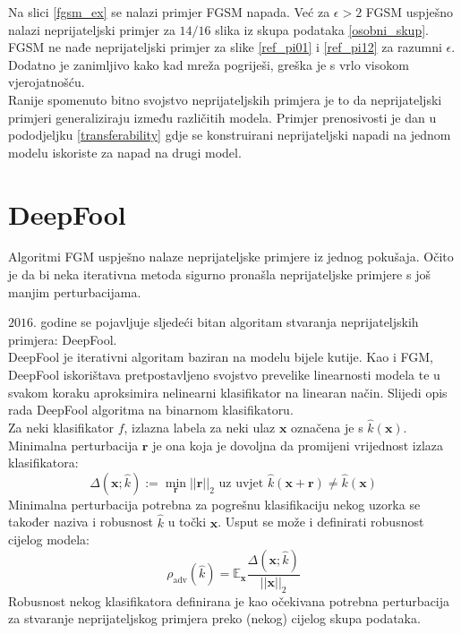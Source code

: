 \documentclass[utf8, diplomski]{fer}
\begin{document}
Na slici \ref{fgsm_ex} se nalazi primjer FGSM napada. Već za $\epsilon > 2$ FGSM uspješno nalazi neprijateljski primjer za $14/16$ slika iz skupa podataka \ref{osobni_skup}. FGSM ne nađe neprijateljski primjer za slike \ref{ref_pi01} i \ref{ref_pi12} za razumni $\epsilon$. Dodatno je zanimljivo kako kad mreža pogriješi, greška je s vrlo visokom vjerojatnošću. \\
Ranije spomenuto bitno svojstvo neprijateljskih primjera je to da neprijateljski primjeri generaliziraju između različitih modela. Primjer prenosivosti je dan u pododjeljku \ref{transferability} gdje se konstruirani neprijateljski napadi na jednom modelu iskoriste za napad na drugi model.
\section{DeepFool}
Algoritmi FGM uspješno nalaze neprijateljske primjere iz jednog pokušaja. Očito je da bi neka iterativna metoda sigurno pronašla neprijateljske primjere s još manjim perturbacijama.
\par
$2016.$ godine se pojavljuje sljedeći bitan algoritam stvaranja neprijateljskih primjera: DeepFool.\\
DeepFool je iterativni algoritam baziran na modelu bijele kutije. Kao i FGM, DeepFool iskorištava pretpostavljeno svojstvo prevelike linearnosti modela te u svakom koraku aproksimira nelinearni klasifikator na linearan način. Slijedi opis rada DeepFool algoritma na binarnom klasifikatoru. \\
Za neki klasifikator $f$, izlazna labela za neki ulaz $\boldsymbol{x}$ označena je s $\hat{k}(\boldsymbol{x})$. Minimalna perturbacija $\boldsymbol{r}$ je ona koja je dovoljna da promijeni vrijednost izlaza klasifikatora:
\begin{equation}
	\Delta (\boldsymbol{x}; \hat{k}) := \mathop{\min}_{\boldsymbol{r}} ||\boldsymbol{r}||_{2} \text{ uz uvjet } \hat{k}(\boldsymbol{x}+\boldsymbol{r}) \neq \hat{k}(\boldsymbol{x})
\end{equation}
Minimalna perturbacija potrebna za pogrešnu klasifikaciju nekog uzorka se također naziva i robusnost $\hat{k}$ u točki $\boldsymbol{x}$. Usput se može i definirati robusnost cijelog modela:
\begin{equation}
	\rho_{\text{adv}}(\hat{k}) = \mathbb{E}_{\boldsymbol{x}} \frac{\Delta (\boldsymbol{x}; \hat{k})}{||\boldsymbol{x}||_{2}} 
\end{equation}
Robusnost nekog klasifikatora definirana je kao očekivana potrebna perturbacija za stvaranje neprijateljskog primjera preko (nekog) cijelog skupa podataka. \\
\end{document}
